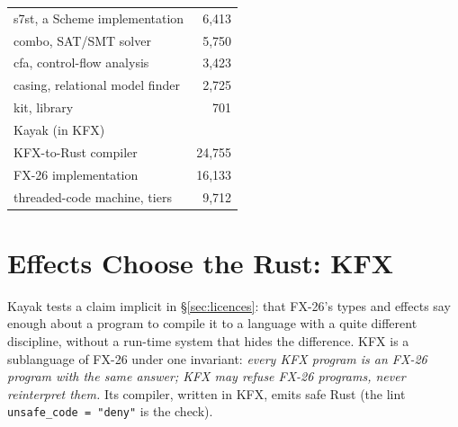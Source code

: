 \documentclass[acmsmall,screen,review]{acmart}
\newcommand{\cd}[1]{\texttt{#1}}
\newcommand{\fx}{FX-26}
\begin{document}
\begin{table}[t]
\begin{minipage}[t]{0.48\linewidth}
\begin{tabular}{@{}lr@{}}
s7st, a Scheme implementation & 6,413\\
combo, SAT/SMT solver & 5,750\\
cfa, control-flow analysis & 3,423\\
casing, relational model finder & 2,725\\
kit, library & 701\\
\midrule
Kayak (in KFX) & \\
\midrule
KFX-to-Rust compiler & 24,755\\
\fx{} implementation & 16,133\\
threaded-code machine, tiers & 9,712\\
\bottomrule
\end{tabular}
\end{minipage}
\end{table}

\section{Effects Choose the Rust: KFX}
\label{sec:kayak}

Kayak tests a claim implicit in \S\ref{sec:licences}: that \fx's types
and effects say enough about a program to compile it to a language
with a quite different discipline, without a run-time system that hides
the difference. KFX is a sublanguage of \fx{} under one invariant:
\emph{every KFX program is an \fx{} program with the same answer; KFX
may refuse \fx{} programs, never reinterpret them.} Its compiler,
written in KFX, emits safe Rust (the lint \cd{unsafe\_code = "deny"} is
the check).
\end{document}
